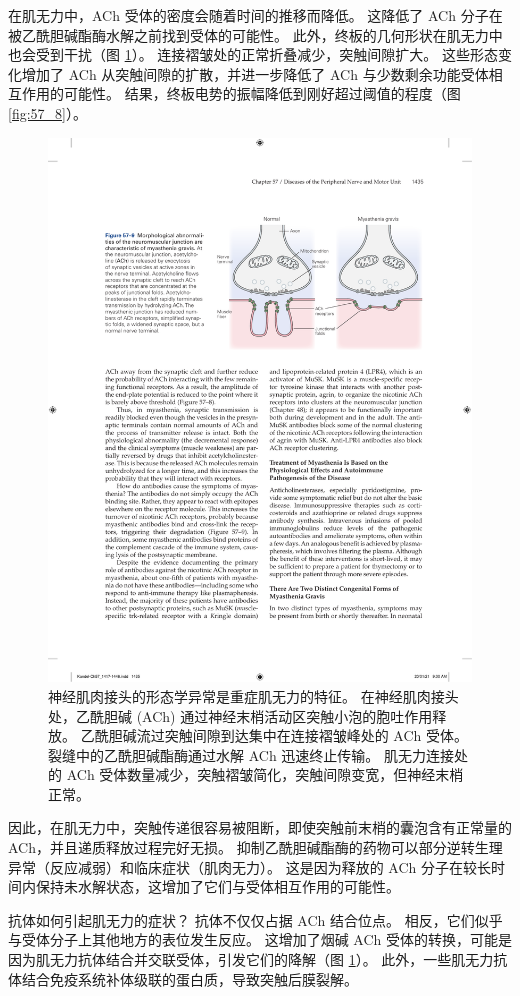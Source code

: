 在肌无力中，ACh 受体的密度会随着时间的推移而降低。 这降低了 ACh 分子在被乙酰胆碱酯酶水解之前找到受体的可能性。 此外，终板的几何形状在肌无力中也会受到干扰（图 \ref{fig:57_9}）。 连接褶皱处的正常折叠减少，突触间隙扩大。 这些形态变化增加了 ACh 从突触间隙的扩散，并进一步降低了 ACh 与少数剩余功能受体相互作用的可能性。 结果，终板电势的振幅降低到刚好超过阈值的程度（图 \ref{fig:57_8}）。

\begin{figure}[htbp]
	\centering
	\includegraphics[width=0.65\linewidth]{chap57/fig_57_9}
	\caption{神经肌肉接头的形态学异常是重症肌无力的特征。 在神经肌肉接头处，乙酰胆碱 (ACh) 通过神经末梢活动区突触小泡的胞吐作用释放。 乙酰胆碱流过突触间隙到达集中在连接褶皱峰处的 ACh 受体。 裂缝中的乙酰胆碱酯酶通过水解 ACh 迅速终止传输。 肌无力连接处的 ACh 受体数量减少，突触褶皱简化，突触间隙变宽，但神经末梢正常。}
	\label{fig:57_9}
\end{figure}

因此，在肌无力中，突触传递很容易被阻断，即使突触前末梢的囊泡含有正常量的 ACh，并且递质释放过程完好无损。 抑制乙酰胆碱酯酶的药物可以部分逆转生理异常（反应减弱）和临床症状（肌肉无力）。 这是因为释放的 ACh 分子在较长时间内保持未水解状态，这增加了它们与受体相互作用的可能性。

抗体如何引起肌无力的症状？ 抗体不仅仅占据 ACh 结合位点。 相反，它们似乎与受体分子上其他地方的表位发生反应。 这增加了烟碱 ACh 受体的转换，可能是因为肌无力抗体结合并交联受体，引发它们的降解（图 \ref{fig:57_9}）。 此外，一些肌无力抗体结合免疫系统补体级联的蛋白质，导致突触后膜裂解。


